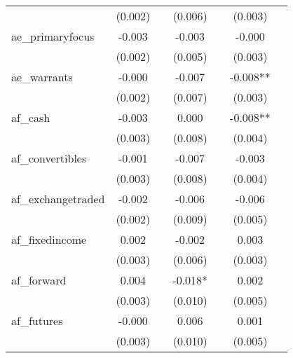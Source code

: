 {\begin{tabular}{l*{6}{c}}
            &     (0.002)   &               &     (0.006)   &               &     (0.003)   &               \\
[1em]
ae\_primaryfocus&      -0.003   &               &      -0.003   &               &      -0.000   &               \\
            &     (0.002)   &               &     (0.005)   &               &     (0.003)   &               \\
[1em]
ae\_warrants &      -0.000   &               &      -0.007   &               &      -0.008** &               \\
            &     (0.002)   &               &     (0.007)   &               &     (0.003)   &               \\
[1em]
af\_cash     &      -0.003   &               &       0.000   &               &      -0.008** &               \\
            &     (0.003)   &               &     (0.008)   &               &     (0.004)   &               \\
[1em]
af\_convertibles&      -0.001   &               &      -0.007   &               &      -0.003   &               \\
            &     (0.003)   &               &     (0.008)   &               &     (0.004)   &               \\
[1em]
af\_exchangetraded&      -0.002   &               &      -0.006   &               &      -0.006   &               \\
            &     (0.002)   &               &     (0.009)   &               &     (0.005)   &               \\
[1em]
af\_fixedincome&       0.002   &               &      -0.002   &               &       0.003   &               \\
            &     (0.003)   &               &     (0.006)   &               &     (0.003)   &               \\
[1em]
af\_forward  &       0.004   &               &      -0.018*  &               &       0.002   &               \\
            &     (0.003)   &               &     (0.010)   &               &     (0.005)   &               \\
[1em]
af\_futures  &      -0.000   &               &       0.006   &               &       0.001   &               \\
            &     (0.003)   &               &     (0.010)   &               &     (0.005)   &               \\

\end{tabular}}

